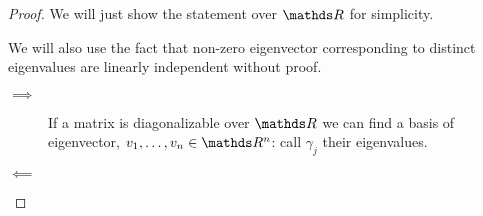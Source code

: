 \documentclass[12pt]{extarticle}
\numberwithin{equation}{section}
\begin{document}
\begin{proof}
    We will just show the statement over $\R$ for simplicity.

    We will also use the fact that non-zero eigenvector corresponding
    to distinct eigenvalues are linearly independent without proof.

    \begin{description}
        \item[$\implies$] If a matrix is diagonalizable over $\R$ we can find a basis of eigenvector,
              $v_1, \dots, v_n \in \R^n$: call $\gamma_j$ their eigenvalues.
        \item[$\impliedby$]
    \end{description}
\end{proof}
\end{document}
